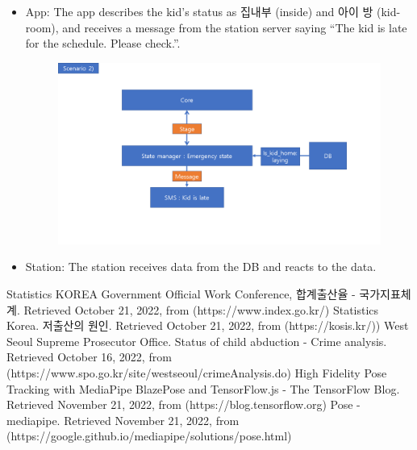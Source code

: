 \documentclass[conference]{IEEEtran}
\begin{document}
\begin{enumerate}[label=\arabic*.]
\begin{enumerate}[label=\arabic*.]
    \begin{itemize}
        \item App: The app describes the kid’s status as 집내부 (inside) and 아이 방 (kid-room), and receives a message from the station server saying “The kid is late for the schedule. Please check.”.\\
        \begin{figure}[H]\centering\includegraphics[scale=0.3]{images/s2.png}\end{figure}
        \item Station: The station receives data from the DB and reacts to the data. \\
    \end{itemize}
\end{enumerate}


\end{enumerate}

\begin{thebibliography}{00}
 Statistics KOREA Government Official Work Conference, 합계출산율 - 국가지표체계. Retrieved October 21, 2022, from (https://www.index.go.kr/)
 Statistics Korea. 저출산의 원인. Retrieved October 21, 2022, from (https://kosis.kr/))
 West Seoul Supreme Prosecutor Office. Status of child abduction - Crime analysis. Retrieved October 16, 2022, from (https://www.spo.go.kr/site/westseoul/crimeAnalysis.do)
 High Fidelity Pose Tracking with MediaPipe BlazePose and TensorFlow.js - The TensorFlow Blog. Retrieved November 21, 2022, from 
(https://blog.tensorflow.org)
 Pose - mediapipe. Retrieved November 21, 2022, from 
(https://google.github.io/mediapipe/solutions/pose.html)
\end{thebibliography}
\end{document}
